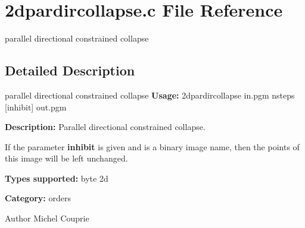 \section{2dpardircollapse.c File Reference}
\label{2dpardircollapse_8c}


parallel directional constrained collapse  




\subsection{Detailed Description}
parallel directional constrained collapse {\bfseries Usage:} 2dpardircollapse in.pgm nsteps [inhibit] out.pgm

{\bfseries Description:} Parallel directional constrained collapse.

If the parameter {\bfseries inhibit} is given and is a binary image name, then the points of this image will be left unchanged.

{\bfseries Types supported:} byte 2d

{\bfseries Category:} orders

\begin{DoxyAuthor}{Author}
Michel Couprie 
\end{DoxyAuthor}
